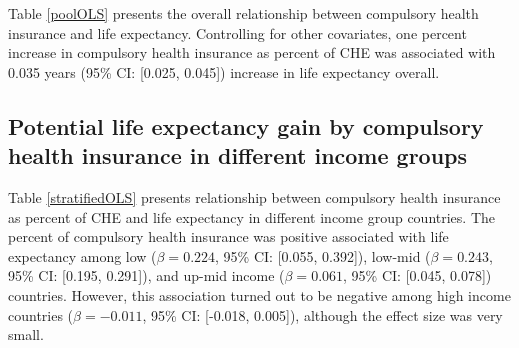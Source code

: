 \documentclass[]{elsarticle} %
\begin{document}
Table \ref{poolOLS} presents the overall relationship between compulsory health insurance and life expectancy. Controlling for other covariates, one percent increase in compulsory health insurance as percent of CHE was associated with 0.035 years (95\% CI: {[}0.025, 0.045{]}) increase in life expectancy overall.

\hypertarget{potential-life-expectancy-gain-by-compulsory-health-insurance-in-different-income-groups}{%
\subsection{Potential life expectancy gain by compulsory health insurance in different income groups}\label{potential-life-expectancy-gain-by-compulsory-health-insurance-in-different-income-groups}}

Table \ref{stratifiedOLS} presents relationship between compulsory health insurance as percent of CHE and life expectancy in different income group countries. The percent of compulsory health insurance was positive associated with life expectancy among low (\(\beta = 0.224\), 95\% CI: {[}0.055, 0.392{]}), low-mid (\(\beta = 0.243\), 95\% CI: {[}0.195, 0.291{]}), and up-mid income (\(\beta = 0.061\), 95\% CI: {[}0.045, 0.078{]}) countries. However, this association turned out to be negative among high income countries (\(\beta = -0.011\), 95\% CI: {[}-0.018, 0.005{]}), although the effect size was very small.
\end{document}
